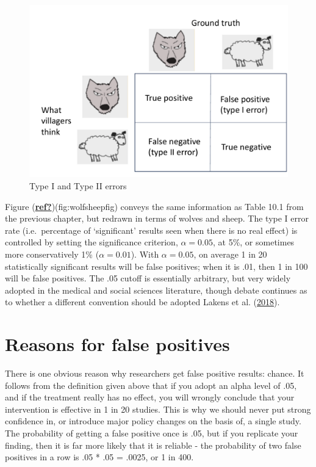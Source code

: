 \documentclass{krantz}
\begin{document}
\begin{center}
\begin{figure}
\includegraphics[width=0.5\linewidth]{images_bw/wolfsheeprevised} \caption{Type I and Type II errors}\label{fig:wolfsheepfig}
\end{figure}
\end{center}

Figure (\protect\hyperlink{ref-ref}{\textbf{ref?}})(fig:wolfsheepfig) conveys the same information as Table 10.1 from the previous chapter, but redrawn in terms of wolves and sheep. The type I error rate (i.e.~percentage of `significant' results seen when there is no real effect) is controlled by setting the significance criterion, \(\alpha=0.05\), at 5\%, or sometimes more conservatively 1\% (\(\alpha=0.01\)). With \(\alpha=0.05\), on average 1 in 20 statistically significant results will be false positives; when it is .01, then 1 in 100 will be false positives. The .05 cutoff is essentially arbitrary, but very widely adopted in the medical and social sciences literature, though debate continues as to whether a different convention should be adopted Lakens et al. (\protect\hyperlink{ref-lakens2018}{2018}).

\hypertarget{reasons-for-false-positives}{%
\section{Reasons for false positives}\label{reasons-for-false-positives}}

There is one obvious reason why researchers get false positive results: chance. It follows from the definition given above that if you adopt an alpha level of .05, and if the treatment really has no effect, you will wrongly conclude that your intervention is effective in 1 in 20 studies. This is why we should never put strong confidence in, or introduce major policy changes on the basis of, a single study. The probability of getting a false positive once is .05, but if you replicate your finding, then it is far more likely that it is reliable - the probability of two false positives in a row is .05 * .05 = .0025, or 1 in 400.
\end{document}
